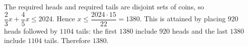 The required heads and required tails are disjoint sets of coins, so $\dfrac{2}{3}x+\dfrac{4}{5}x\le2024$. Hence $x\le\dfrac{2024\cdot15}{22}=1380$. This is attained by placing $920$ heads followed by $1104$ tails: the first $1380$ include $920$ heads and the last $1380$ include $1104$ tails. Therefore $\boxed{1380}$.
